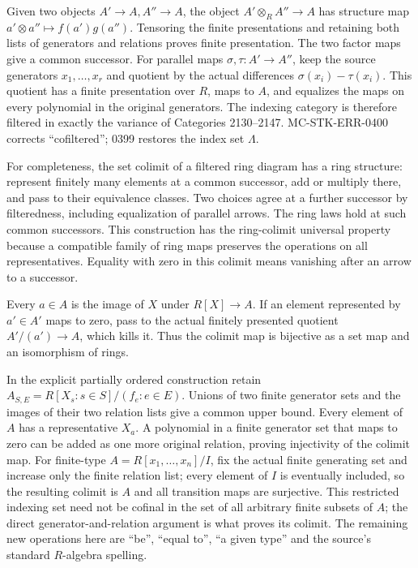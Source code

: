 Given two objects \(A'\to A,A''\to A\), the object \(A'\otimes_R A''\to A\) has structure map \(a'\otimes a''\mapsto f(a')g(a'')\). Tensoring the finite presentations and retaining both lists of generators and relations proves finite presentation. The two factor maps give a common successor. For parallel maps \(\sigma,\tau:A'\to A''\), keep the source generators \(x_1,\ldots,x_r\) and quotient by the actual differences \(\sigma(x_i)-\tau(x_i)\). This quotient has a finite presentation over \(R\), maps to \(A\), and equalizes the maps on every polynomial in the original generators. The indexing category is therefore filtered in exactly the variance of Categories 2130--2147. MC-STK-ERR-0400 corrects ``cofiltered''; 0399 restores the index set \(\Lambda\).

For completeness, the set colimit of a filtered ring diagram has a ring structure: represent finitely many elements at a common successor, add or multiply there, and pass to their equivalence classes. Two choices agree at a further successor by filteredness, including equalization of parallel arrows. The ring laws hold at such common successors. This construction has the ring-colimit universal property because a compatible family of ring maps preserves the operations on all representatives. Equality with zero in this colimit means vanishing after an arrow to a successor.

Every \(a\in A\) is the image of \(X\) under \(R[X]\to A\). If an element represented by \(a'\in A'\) maps to zero, pass to the actual finitely presented quotient \(A'/(a')\to A\), which kills it. Thus the colimit map is bijective as a set map and an isomorphism of rings.

In the explicit partially ordered construction retain \(A_{S,E}=R[X_s:s\in S]/(f_e:e\in E)\). Unions of two finite generator sets and the images of their two relation lists give a common upper bound. Every element of \(A\) has a representative \(X_a\). A polynomial in a finite generator set that maps to zero can be added as one more original relation, proving injectivity of the colimit map. For finite-type \(A=R[x_1,\ldots,x_n]/I\), fix the actual finite generating set and increase only the finite relation list; every element of \(I\) is eventually included, so the resulting colimit is \(A\) and all transition maps are surjective. This restricted indexing set need not be cofinal in the set of all arbitrary finite subsets of \(A\); the direct generator-and-relation argument is what proves its colimit. The remaining new operations here are ``be'', ``equal to'', ``a given type'' and the source's standard \(R\)-algebra spelling.

